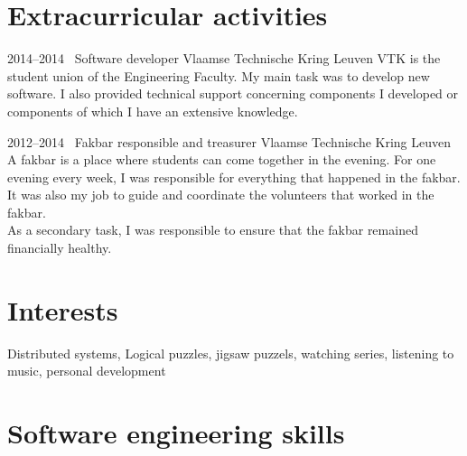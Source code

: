 \documentclass[a4paper]{friggeri-cv} %
\begin{document}
\section{Extracurricular activities}

\begin{entrylist}
\entry
{2014--2014~}
{Software developer}
{Vlaamse Technische Kring Leuven}
{VTK is the student union of the Engineering Faculty. My main task was to develop new software. I also provided technical support concerning components I developed or components of which I have an extensive knowledge.
~}

\entry
{2012--2014~}
{Fakbar responsible and treasurer}
{Vlaamse Technische Kring Leuven}
{A fakbar is a place where students can come together in the evening. For one evening every week, I was responsible for everything that happened in the fakbar. It was also my job to guide and coordinate the volunteers that worked in the fakbar.\\
As a secondary task, I was responsible to ensure that the fakbar remained financially healthy.
~}


\end{entrylist}



\section{Interests}

Distributed systems, Logical puzzles, jigsaw puzzels, watching series, listening to music, personal development

\newpage
\addtolength{\oddsidemargin}{-1.7cm}
\addtolength{\evensidemargin}{-1.7cm}

\section{Software engineering skills}
\end{document}
